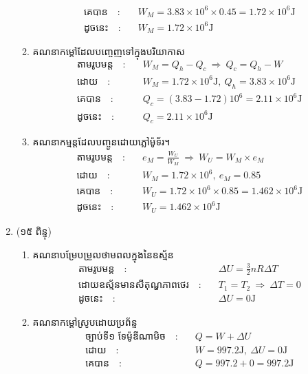 \documentclass{classes/exam}
\begin{document}
\begin{enumerate}[I]
\begin{enumerate}[k]
\begin{align*}
			\text{គេបាន}\quad :&\quad W_{M}=3.83\times 10^{6}\times 0.45=1.72\times 10^{6}\si{\joule}\\
			\text{ដូចនេះ}\quad :&\quad W_{M}=1.72\times 10^{6}\si{\joule}
		\end{align*}
		\item គណនាកម្តៅដែលបញ្ចេញទៅក្នុងបរិយាកាស
			\begin{align*}
				\text{តាមរូបមន្ត}\quad:&\quad W_{M}=Q_{h}-Q_{c}~\Rightarrow~Q_{c}=Q_{h}-W\\
				\text{ដោយ}\quad :&\quad W_{M}=1.72\times 10^{6}\si{\joule},~Q_{h}=3.83\times 10^{6}\si{\joule}\\
				\text{គេបាន}\quad :&\quad Q_{c}=\left(3.83-1.72\right)10^{6}=2.11\times 10^{6}\si{\joule}\\
				\text{ដូចនេះ}\quad :&\quad Q_{c}=2.11\times 10^{6}\si{\joule}
			\end{align*}
		\item គណនាកម្មន្តដែលបញ្ចូនដោយភ្លៅម៉ូទ័រ។
		\begin{align*}
			\text{តាមរូបមន្ត}\quad:&\quad e_{M}=\frac{W_{U}}{W_{M}}~\Rightarrow~W_{U}=W_{M}\times e_{M}\\
			\text{ដោយ}\quad :&\quad W_{M}=1.72\times 10^{6},~e_{M}=0.85\\
			\text{គេបាន}\quad :&\quad W_{U}=1.72\times 10^{6}\times 0.85=1.462\times 10^{6}\si{\joule}\\
			\text{ដូចនេះ}\quad :&\quad W_{U}=1.462\times 10^{6}\si{\joule}
		\end{align*}
	\end{enumerate}
	\item {\color{magenta}\ks (១៥ ពិន្ទុ)}
	\begin{enumerate}[k]
		\item គណនាបម្រែបម្រួលថាមពលក្នុងនៃឧស្ម័ន
			\begin{align*}
				\text{តាមរូបមន្ត}\quad :&\quad \Delta U=\frac{3}{2}nR \Delta T\\
				\text{ដោយឧស្ម័នមានសីតុណ្ហភាពថេរ}\quad :&\quad T_{1}=T_{2}~\Rightarrow~\Delta T=0\\
				\text{ដូចនេះ}\quad :&\quad \Delta U=0\si{\joule}
			\end{align*}
		\item គណនាកម្តៅស្រូបដោយប្រព័ន្ទ
			\begin{align*}
				\text{ច្បាប់ទី១ ទែម៉ូឌីណាមិច}\quad :&\quad Q=W+\Delta U\\
				\text{ដោយ}\quad :&\quad W=997.2\si{\joule},~\Delta U=0\si{\joule}\\
				\text{គេបាន}\quad :&\quad Q=997.2+0=997.2\si{\joule}\\

\end{align*}
\end{enumerate}
\end{enumerate}
\end{document}
